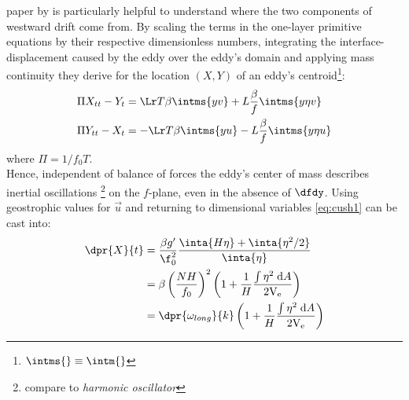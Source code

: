  paper by \citet{Cushman-Roisin1990} is particularly helpful to understand where the two components of westward drift come from.
By scaling the terms in the one-layer primitive equations by their respective dimensionless numbers, integrating the interface-displacement caused by the eddy over the eddy's domain and applying mass continuity they derive for the location $(X,Y)$ of an eddy's centroid\footnote{$\intms{}\equiv \intm{}$}:
\begin{equation}\begin{split}
	\Pi X_{tt} - Y_t
	&=
	\Lr T \beta     \intms{yv}
	+
	L\frac{  \beta  }{ f   } \intms{y\eta v}\\
	\Pi Y_{tt} - X_t
	&=
	-\Lr T \beta   \intms{yu}
	-
	L\frac{  \beta  }{ f   }  \intms{y\eta u} 	  \label{eq:cush1}
\end{split}\end{equation}
where $\Pi=1/f_0T$.\\
 Hence, independent of balance of forces the eddy's center of mass describes inertial oscillations \footnote{compare to \textit{harmonic oscillator}} on the $f$-plane, even in the absence of $\dfdy$.
Using geostrophic values for $\vec{u}$ and returning to dimensional variables \eqref{eq:cush1} can be cast into:
\begin{align}
	\dpr{X}{t}
	&=
	\frac{\beta g'}{\f_{0}^{2}}
	\frac{\inta{H\eta} + \inta{\eta^{2}/2}}{\inta{\eta}} 	\\
	&=
	\beta \left( 	\frac{NH}{f_{0}}  \right)^{2}
	\left(1 +\frac{1}{H} \frac{ \int  \eta^2 \; \mathrm{d}A	}{2\mathrm{V_e}} \right)
	\label{eq:cushmanDrift}	\\
	&=
	\dpr{\omega_{long}}{k}
	\left(1 +\frac{1}{H} \frac{ \int  \eta^2 \; \mathrm{d}A	}{2\mathrm{V_e}} \right)
	\end{align}

